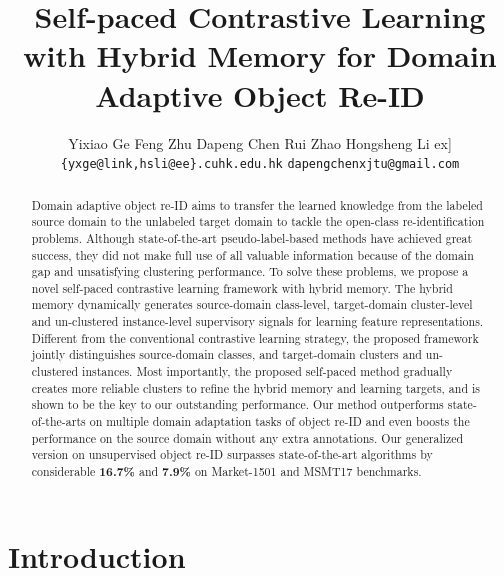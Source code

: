 \documentclass{article}
\title{Self-paced Contrastive Learning with Hybrid Memory for Domain Adaptive Object Re-ID}
\author{Yixiao Ge  \quad Feng Zhu  \quad Dapeng Chen  \quad Rui Zhao  \quad Hongsheng Li \1ex]\texttt{\{yxge@link,hsli@ee\}.cuhk.edu.hk} \quad \texttt{dapengchenxjtu@gmail.com} \\
}
\begin{document}
\maketitle


\begin{abstract}
\vspace{-5pt}

Domain adaptive object re-ID aims to transfer the learned knowledge from the labeled source domain to the unlabeled target domain to tackle the open-class re-identification problems. Although state-of-the-art pseudo-label-based methods \cite{ge2020mutual,zhai2020ad,yang2019selfsimilarity,zhang2019self,ge2020structured} have achieved great success, they did not make full use of all valuable information because of the domain gap and unsatisfying clustering performance. To solve these problems, we propose a novel self-paced contrastive learning framework with hybrid memory. The hybrid memory dynamically generates source-domain class-level, target-domain cluster-level and un-clustered instance-level supervisory signals for learning feature representations. Different from the conventional contrastive learning strategy, the proposed framework jointly distinguishes source-domain classes, and target-domain clusters and un-clustered instances. Most importantly, the proposed self-paced method gradually creates more reliable clusters to refine the hybrid memory and learning targets, and is shown to be the key to our outstanding performance. Our method outperforms state-of-the-arts on multiple domain adaptation tasks of object re-ID and even boosts the performance on the source domain without any extra annotations. Our generalized version on unsupervised object re-ID surpasses state-of-the-art algorithms by considerable \textbf{16.7\%} and \textbf{7.9\%} on Market-1501 and MSMT17 benchmarks\footnotemark[2]. 



\end{abstract}


\section{Introduction}
\vspace{-5pt}
\end{document}

